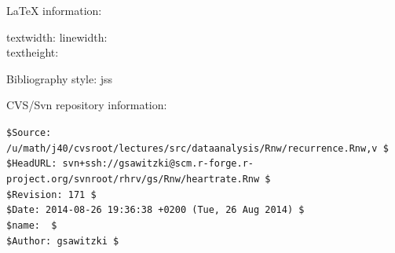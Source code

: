 \documentclass[a4paper, english, utf8]{amsart}
\begin{document}
\LaTeX{} information:
{\tiny

\currentpage 
textwidth: \prntlen{\textwidth} \qquad 
linewidth:\prntlen{\linewidth}\\
textheight: \prntlen{\textheight}\\
}

Bibliography style: jss

CVS/Svn repository information:

{\tiny%
\noindent
\verb+$Source: /u/math/j40/cvsroot/lectures/src/dataanalysis/Rnw/recurrence.Rnw,v $+\\
\verb!$HeadURL: svn+ssh://gsawitzki@scm.r-forge.r-project.org/svnroot/rhrv/gs/Rnw/heartrate.Rnw $!\\
\verb+$Revision: 171 $+\\
\verb!$Date: 2014-08-26 19:36:38 +0200 (Tue, 26 Aug 2014) $!\\
\verb+$name:  $+\\
\verb+$Author: gsawitzki $+
}
\end{document}
